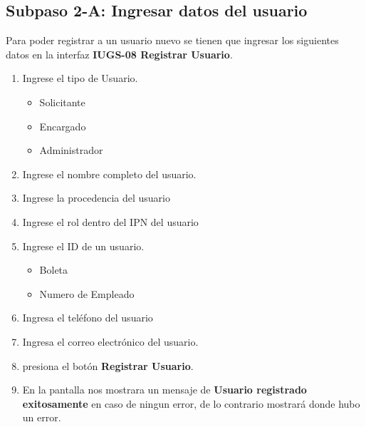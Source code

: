 \subsection{Subpaso 2-A: Ingresar datos del usuario}
Para poder registrar a un usuario nuevo se tienen que ingresar los siguientes datos en la interfaz
\textbf{IUGS-08 Registrar Usuario}.
\begin{enumerate}

	\item Ingrese el tipo de Usuario.
	\begin{itemize}
		\item Solicitante
		\item Encargado
		\item Administrador
	\end{itemize}
	\item Ingrese el nombre completo del usuario.
	\item Ingrese la procedencia del usuario
	\item Ingrese el rol dentro del IPN del usuario
	\item Ingrese el ID de un usuario.
	\begin{itemize}
		\item Boleta
		\item Numero de Empleado
	\end{itemize}
	\item Ingresa el teléfono del usuario
	\item Ingresa el correo electrónico del usuario.
	\item presiona el botón \textbf{Registrar Usuario}.
	\item En la pantalla nos mostrara un mensaje de \textbf{Usuario registrado exitosamente} en caso de ningun error, de lo contrario mostrará donde hubo un error.
\end{enumerate}

	